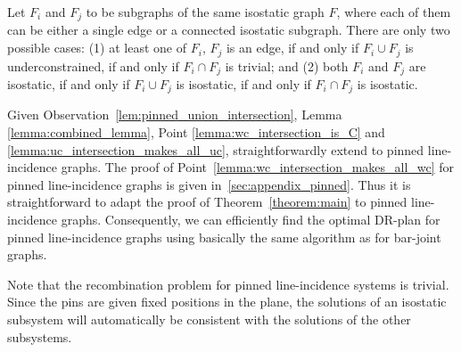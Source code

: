\begin{observation}\label{lem:pinned_union_intersection}
    Let $F_i$ and $F_j$ to be subgraphs of the same isostatic graph $F$, where each of them can be either a single edge or a connected isostatic subgraph. There are only two possible cases:
    (1) at least one of $F_i$, $F_j$ is an edge, if and only if $F_i \cup F_j$ is underconstrained, if and only if $F_i \cap F_j$ is trivial; and (2) both $F_i$ and $F_j$ are isostatic, if and only if $F_i \cup F_j$ is isostatic, if and only if $F_i \cap F_j$ is isostatic.
\end{observation}

Given Observation~\ref{lem:pinned_union_intersection}, %
Lemma \ref{lemma:combined_lemma}, Point \ref{lemma:wc_intersection_is_C} and \ref{lemma:uc_intersection_makes_all_uc}, straightforwardly extend to pinned line-incidence graphs. The proof of Point~\ref{lemma:wc_intersection_makes_all_wc} for pinned line-incidence graphs is given in~\ref{sec:appendix_pinned}.
Thus it is straightforward to adapt the proof of Theorem~\ref{theorem:main} to  pinned line-incidence graphs.
%
Consequently, we can efficiently find the optimal DR-plan for  pinned line-incidence graphs using basically the same algorithm as for  bar-joint graphs.

Note that the recombination problem for pinned line-incidence systems is trivial. Since the pins are given fixed positions in the plane, the solutions of an isostatic subsystem will automatically be consistent with the solutions of the other subsystems.


